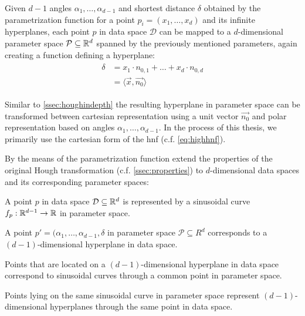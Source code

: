 Given $d-1$ angles $\alpha_1,\dotsc,\alpha_{d-1}$ and shortest distance $\delta$ obtained by the parametrization function for a point $p_i = (x_1,\dotsc,x_d)$ and its infinite hyperplanes, each point $p$ in data space $\mathcal{D}$ can be mapped to a $d$-dimensional parameter space $\mathcal{P} \subseteq \mathbb{R}^d$ spanned by the previously mentioned parameters, again creating a function defining a hyperplane:
\begin{align}
    \begin{split}
        \delta &= x_1 \cdot n_{0,1} + \dots + x_d \cdot n_{0,d}\\
        &= \langle \vec{x},\vec{n_0} \rangle\label{eq:highhnf}
    \end{split}
\end{align}

Similar to \autoref{ssec:houghindepth} the resulting hyperplane in parameter space can be transformed between  cartesian representation using a unit vector $\vec{n_0}$ and polar representation based on angles $\alpha_1,\dotsc,\alpha_{d-1}$. In the process of this thesis, we primarily use the cartesian form of the \gls{hnf} (c.f. \autoref{eq:highhnf}).


By the means of the parametrization function \textcite{CASHachtert2008robust} extend the properties of the original Hough transformation (c.f. \autoref{ssec:properties}) to $d$-dimensional data spaces and its corresponding parameter spaces: 
\begin{quoting}
\begin{property}
A point $p$ in data space $\mathcal{D} \subseteq \mathbb{R}^d$ is represented by a sinusoidal curve $f_p:\mathbb{R}^{d-1}\rightarrow\mathbb{R}$ in parameter space.
\end{property}
\begin{property}
A point $p' = (\alpha_1,\dotsc,\alpha_{d-1},\delta$ in parameter space $\mathcal{P} \subseteq R^d$ corresponds to a $(d-1)$-dimensional hyperplane in data space.
\end{property}
\begin{property}
Points that are located on a $(d-1)$-dimensional hyperplane in data space correspond to sinusoidal curves through a common point in parameter space.
\end{property}
\begin{property}
Points lying on the same sinusoidal curve in parameter space represent $(d-1)$-dimensional hyperplanes through the same point in data space.
\end{property}
\end{quoting}

